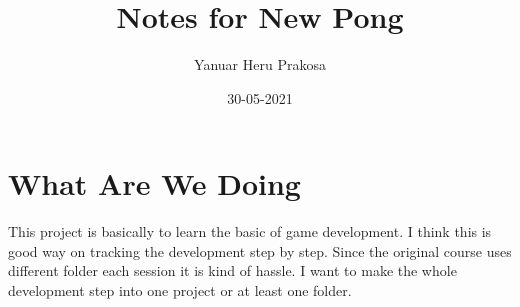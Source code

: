 \documentclass{article}
\title{Notes for New Pong}
\author{Yanuar Heru Prakosa}
\date{30-05-2021}
\begin{document}
    \maketitle

    \section{What Are We Doing}
    This project is basically to learn the basic of game development.
    I think this is good way on tracking the development step by step.
    Since the original course uses different folder each session it is kind of hassle.
    I want to make the whole development step into one project or at least one folder. 
\end{document}
